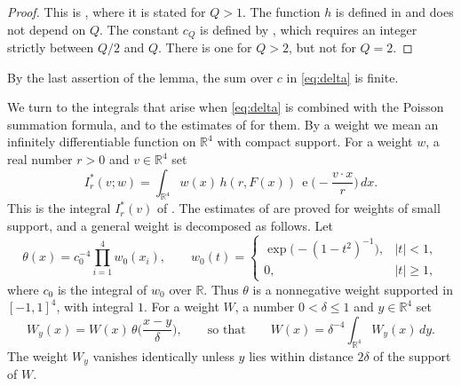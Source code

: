 \documentclass[11pt]{amsart}
\numberwithin{equation}{section}
\numberwithin{figure}{section}
\theoremstyle{definition}
\newcommand{\R}{\mathbb{R}}
\newcommand{\e}{\operatorname{e}}
\newcommand{\abs}[1]{\lvert #1\rvert}
\begin{document}
\begin{proof}
This is \cite[Theorem~1]{HB}, where it is stated for $Q>1$. The
function $h$ is defined in \cite[Section~3]{HB} and does not depend
on $Q$. The constant $c_Q$ is defined by \cite[(3.3)]{HB}, which
requires an integer strictly between $Q/2$ and $Q$. There is one for
$Q>2$, but not for $Q=2$.
\end{proof}

By the last assertion of the lemma, the sum over $c$ in
\eqref{eq:delta} is finite.

We turn to the integrals that arise when \eqref{eq:delta} is combined
with the Poisson summation formula, and to the estimates of \cite{HB}
for them. By a weight we mean an infinitely differentiable function
on $\R^4$ with compact support. For a weight $w$, a real number
$r>0$ and $v\in\R^4$ set
\begin{equation}\label{eq:Istar}
 I_r^*(v;w)=\int_{\R^4}w(x)\,h(r,F(x))\,
 \e\Big(-\frac{v\cdot x}r\Big)\,dx.
\end{equation}
This is the integral $I_r^*(v)$ of \cite[Section~7]{HB}. The
estimates of \cite{HB} are proved for weights of small support, and
a general weight is decomposed as follows. Let
\[
 \theta(x)=c_0^{-4}\prod_{i=1}^4w_0(x_i),\qquad
 w_0(t)=\begin{cases}\exp\big(-(1-t^2)^{-1}\big),&\abs t<1,\\
 0,&\abs t\ge1,\end{cases}
\]
where $c_0$ is the integral of $w_0$ over $\R$. Thus $\theta$ is a
nonnegative weight supported in $[-1,1]^4$, with integral $1$. For a
weight $W$, a number $0<\delta\le1$ and $y\in\R^4$ set
\begin{equation}\label{eq:pieces}
 W_y(x)=W(x)\,\theta\Big(\frac{x-y}\delta\Big),
 \qquad\text{so that}\qquad
 W(x)=\delta^{-4}\int_{\R^4}W_y(x)\,dy.
\end{equation}
The weight $W_y$ vanishes identically unless $y$ lies within distance
$2\delta$ of the support of $W$.
\end{document}
